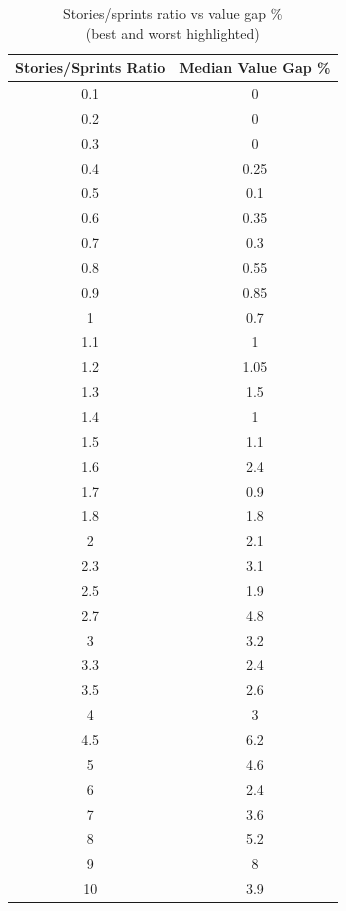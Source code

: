 \begin{table}[h!]
\centering
\begin{tabular}{|c|c|}
\hline
\textbf{Stories/Sprints Ratio} & \textbf{Median Value Gap \%} \\ \hline
\rowcolor[HTML]{67FD9A} 
0.1 & 0 \\ \hline
\rowcolor[HTML]{67FD9A} 
0.2 & 0 \\ \hline
\rowcolor[HTML]{67FD9A} 
0.3 & 0 \\ \hline
0.4 & 0.25 \\ \hline
0.5 & 0.1 \\ \hline
0.6 & 0.35 \\ \hline
0.7 & 0.3 \\ \hline
0.8 & 0.55 \\ \hline
0.9 & 0.85 \\ \hline
1 & 0.7 \\ \hline
1.1 & 1 \\ \hline
1.2 & 1.05 \\ \hline
1.3 & 1.5 \\ \hline
1.4 & 1 \\ \hline
1.5 & 1.1 \\ \hline
1.6 & 2.4 \\ \hline
1.7 & 0.9 \\ \hline
1.8 & 1.8 \\ \hline
2 & 2.1 \\ \hline
2.3 & 3.1 \\ \hline
2.5 & 1.9 \\ \hline
2.7 & 4.8 \\ \hline
3 & 3.2 \\ \hline
3.3 & 2.4 \\ \hline
3.5 & 2.6 \\ \hline
4 & 3 \\ \hline
4.5 & 6.2 \\ \hline
5 & 4.6 \\ \hline
6 & 2.4 \\ \hline
7 & 3.6 \\ \hline
8 & 5.2 \\ \hline
\rowcolor[HTML]{FD6864} 
9 & 8 \\ \hline
10 & 3.9 \\ \hline
\end{tabular}
\caption{Stories/sprints ratio vs value gap \%\\(best and worst highlighted)}
\label{stories_sprints_ratio_vs_value_gap}
\end{table}

